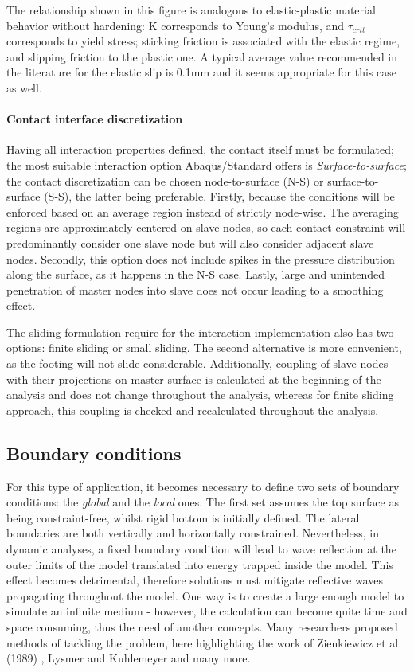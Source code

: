 The relationship shown in this figure is analogous to elastic-plastic material behavior without hardening: K corresponds to Young's modulus, and $\tau_{crit}$ corresponds to yield stress; sticking friction is associated with the elastic regime, and slipping friction to the plastic one. A typical average value recommended in the literature for the elastic slip is 0.1mm and it seems appropriate for this case as well.

\paragraph{Contact interface discretization}
Having all interaction properties defined, the contact itself must be formulated; the most suitable interaction option Abaqus/Standard offers is \textit{Surface-to-surface}; the contact discretization can be chosen node-to-surface (N-S) or surface-to-surface (S-S), the latter being preferable. Firstly, because the conditions will be enforced based on an average region instead of strictly node-wise. The averaging regions are approximately centered on slave nodes, so each contact constraint will predominantly consider one slave node but will also consider adjacent slave nodes. Secondly, this option does not include spikes in the pressure distribution along the surface, as it happens in the N-S case. Lastly, large and unintended penetration of master nodes into slave does not occur leading to a smoothing effect.

The sliding formulation require for the interaction implementation also has two options: finite sliding or small sliding. The second alternative is more convenient, as the footing will not slide considerable. Additionally, coupling of slave nodes with their projections on master surface
is calculated at the beginning of the analysis and does not change throughout the analysis,
whereas for finite sliding approach, this coupling is checked and recalculated throughout the
analysis.

\subsection{Boundary conditions}
For this type of application, it becomes necessary to define two sets of boundary conditions: the \textit{global} and the \textit{local} ones. The first set assumes the top surface as being constraint-free, whilst rigid bottom is initially defined. The lateral boundaries are both vertically and horizontally constrained.
Nevertheless, in dynamic analyses, a fixed boundary condition will lead to wave reflection at the outer limits of the model translated into energy trapped inside the model. This effect becomes detrimental, therefore solutions must mitigate reflective waves propagating throughout the model. One way is to create a large enough model to simulate an infinite medium - however, the calculation can become quite time and space consuming, thus the need of another concepts. Many researchers proposed methods of tackling the problem, here highlighting the work of  Zienkiewicz et al (1989) \cite{zienkiewicz1989earthquake}, Lysmer and Kuhlemeyer \cite{zienkiewicz1989earthquake} and many more.

